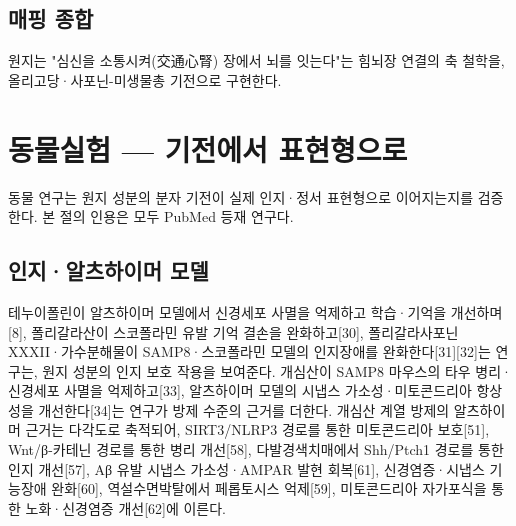 \documentclass[11pt,oneside]{book}
\begin{document}
\subsection{매핑 종합}
\vspace{2pt}\vspace{3pt}

원지는 "심신을 소통시켜(交通心腎) 장에서 뇌를 잇는다"는 힘뇌장 연결의 축 철학을, 올리고당·사포닌-미생물총 기전으로 구현한다.

\section{동물실험 — 기전에서 표현형으로}
동물 연구는 원지 성분의 분자 기전이 실제 인지·정서 표현형으로 이어지는지를 검증한다. 본 절의 인용은 모두 PubMed 등재 연구다.

\subsection{인지·알츠하이머 모델}
테누이폴린이 알츠하이머 모델에서 신경세포 사멸을 억제하고 학습·기억을 개선하며[8], 폴리갈라산이 스코폴라민 유발 기억 결손을 완화하고[30], 폴리갈라사포닌 XXXII·가수분해물이 SAMP8·스코폴라민 모델의 인지장애를 완화한다[31][32]는 연구는, 원지 성분의 인지 보호 작용을 보여준다. 개심산이 SAMP8 마우스의 타우 병리·신경세포 사멸을 억제하고[33], 알츠하이머 모델의 시냅스 가소성·미토콘드리아 항상성을 개선한다[34]는 연구가 방제 수준의 근거를 더한다. 개심산 계열 방제의 알츠하이머 근거는 다각도로 축적되어, SIRT3/NLRP3 경로를 통한 미토콘드리아 보호[51], Wnt/β-카테닌 경로를 통한 병리 개선[58], 다발경색치매에서 Shh/Ptch1 경로를 통한 인지 개선[57], Aβ 유발 시냅스 가소성·AMPAR 발현 회복[61], 신경염증·시냅스 기능장애 완화[60], 역설수면박탈에서 페롭토시스 억제[59], 미토콘드리아 자가포식을 통한 노화·신경염증 개선[62]에 이른다.
\end{document}
